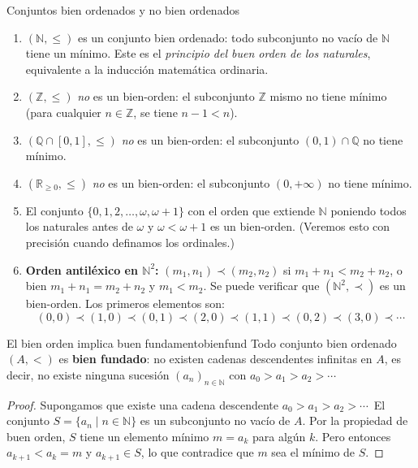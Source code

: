 \begin{ejemplo}{Conjuntos bien ordenados y no bien ordenados}{}
\begin{enumerate}[leftmargin=2em, label=(\alph*)]
  \item $(\mathbb{N}, \leq)$ es un conjunto bien ordenado: todo subconjunto no vacío de $\mathbb{N}$ tiene un mínimo. Este es el \emph{principio del buen orden de los naturales}, equivalente a la inducción matemática ordinaria.

  \item $(\mathbb{Z}, \leq)$ \emph{no} es un bien-orden: el subconjunto $\mathbb{Z}$ mismo no tiene mínimo (para cualquier $n \in \mathbb{Z}$, se tiene $n-1 < n$).

  \item $(\mathbb{Q} \cap [0,1], \leq)$ \emph{no} es un bien-orden: el subconjunto $(0,1) \cap \mathbb{Q}$ no tiene mínimo.

  \item $(\mathbb{R}_{\geq 0}, \leq)$ \emph{no} es un bien-orden: el subconjunto $(0, +\infty)$ no tiene mínimo.

  \item El conjunto $\{0, 1, 2, \ldots, \omega, \omega+1\}$ con el orden que extiende $\mathbb{N}$ poniendo todos los naturales antes de $\omega$ y $\omega < \omega+1$ es un bien-orden. (Veremos esto con precisión cuando definamos los ordinales.)

  \item \textbf{Orden antiléxico en $\mathbb{N}^2$:} $(m_1, n_1) \prec (m_2, n_2)$ si $m_1 + n_1 < m_2 + n_2$, o bien $m_1 + n_1 = m_2 + n_2$ y $m_1 < m_2$. Se puede verificar que $(\mathbb{N}^2, \prec)$ es un bien-orden. Los primeros elementos son:
  \[
    (0,0) \prec (1,0) \prec (0,1) \prec (2,0) \prec (1,1) \prec (0,2) \prec (3,0) \prec \cdots
  \]
\end{enumerate}
\end{ejemplo}

\begin{proposicion}{El bien orden implica buen fundamento}{bienfund}
Todo conjunto bien ordenado $(A, <)$ es \textbf{bien fundado}: no existen cadenas descendentes infinitas en $A$, es decir, no existe ninguna sucesión $(a_n)_{n \in \mathbb{N}}$ con $a_0 > a_1 > a_2 > \cdots$
\end{proposicion}

\begin{proof}
Supongamos que existe una cadena descendente $a_0 > a_1 > a_2 > \cdots$\ El conjunto $S = \{a_n \mid n \in \mathbb{N}\}$ es un subconjunto no vacío de $A$. Por la propiedad de buen orden, $S$ tiene un elemento mínimo $m = a_k$ para algún $k$. Pero entonces $a_{k+1} < a_k = m$ y $a_{k+1} \in S$, lo que contradice que $m$ sea el mínimo de $S$.
\end{proof}

